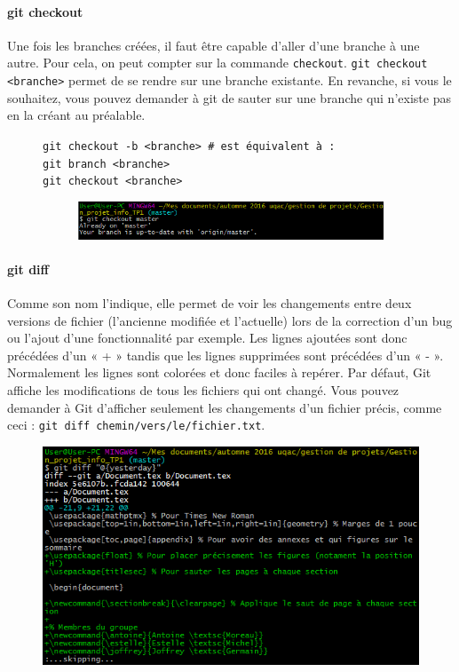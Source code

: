 \documentclass[11pt,canadien]{article}
\begin{document}
\paragraph{git checkout}Une fois les branches créées, il faut être capable d'aller d'une branche à une autre. Pour cela, on peut compter sur la commande \texttt{checkout}. \texttt{git checkout <branche>} permet de se rendre sur une branche existante. En revanche, si vous le souhaitez, vous pouvez demander à git de sauter sur une branche qui n'existe pas en la créant au préalable.
\begin{figure}[H]
	\texttt{git checkout -b <branche> \# est équivalent à : \\
		    git branch <branche> \\
			git checkout <branche>}
	\begin{figure}[H]
		\centering
		\includegraphics{images/git_checkout.png}
	\end{figure}
\end{figure}

\paragraph{git diff}Comme son nom l’indique, elle permet de voir les changements entre deux versions de fichier (l’ancienne modifiée et l’actuelle) lors de la correction d’un bug ou l’ajout d’une fonctionnalité par exemple. Les lignes ajoutées sont donc précédées d’un « + » tandis que les lignes supprimées sont précédées d’un « - ». Normalement les lignes sont colorées et donc faciles à repérer. Par défaut, Git affiche les modifications de tous les fichiers qui ont changé. Vous pouvez demander à Git d’afficher seulement les changements d’un fichier précis, comme ceci : \texttt{git diff chemin/vers/le/fichier.txt}.
\begin{figure}[H]
	\centering
	\includegraphics{images/git_diff.png}
\end{figure}
\end{document}
